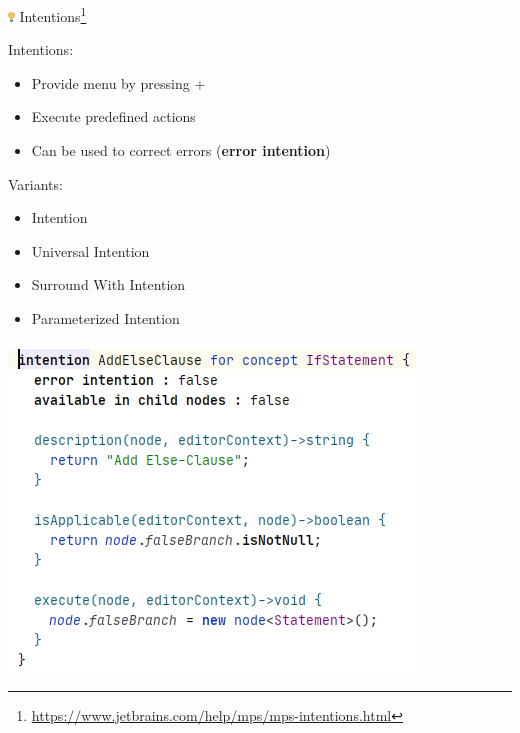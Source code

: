 	\begin{frame}{\includegraphics[height=0.25cm]{graphics/intentions.png} Intentions\footnote{\url{https://www.jetbrains.com/help/mps/mps-intentions.html}}}
		\begin{minipage}{0.52\textwidth}
			Intentions:
			\begin{itemize}
				\item Provide \menu{\workshopintention} menu by pressing +\menu{\return}
				\item Execute predefined actions
				\item Can be used to correct errors (\textbf{error intention})
			\end{itemize}
			Variants:
			\begin{itemize}
				\item Intention
				\item Universal Intention
				\item Surround With Intention
				\item Parameterized Intention
			\end{itemize}
		\end{minipage}
		\begin{minipage}{0.4\textwidth}
			\includegraphics[height=0.8\textheight]{illustrations/intention.png}
		\end{minipage}
	\end{frame}

